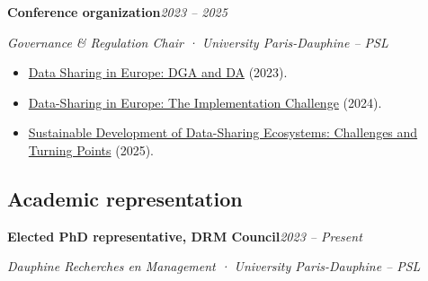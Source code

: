 \documentclass[11pt,a4paper]{article}
\newlength{\cvindent}
\newenvironment{cvblock}[1][1]{%
  \par\noindent\hspace*{#1\cvindent}%
  \begin{minipage}{\dimexpr\linewidth-#1\cvindent\relax}%
}{%
  \end{minipage}\par
}
\newenvironment{cvdetails}{%
  \begin{list}{}{%
    \setlength{\leftmargin}{\cvindent}%
    \setlength{\rightmargin}{0pt}%
    \setlength{\topsep}{0.1em}%
    \setlength{\partopsep}{0pt}%
    \setlength{\parsep}{0.05em}%
    \setlength{\itemsep}{0pt}%
  }\item[]\small\ignorespaces
}{%
  \end{list}
}
\begin{document}
\begin{cvblock}[2]
\textbf{Conference organization}\hfill\textit{2023 -- 2025}\par
\begin{cvdetails}
{\small\itshape Governance \& Regulation Chair · University Paris-Dauphine -- PSL}\par
\begin{itemize}
  \item \href{https://chairgovreg.fondation-dauphine.fr/fr/ressources/1603/replay-data-sharing-europe-dga-and-da-legal-consensus-achievement-implementation}{Data Sharing in Europe: DGA and DA} (2023).
  \item \href{https://chairgovreg.fondation-dauphine.fr/en/publication/1809/synthesis-data-sharing-europe-implementation-challenge}{Data-Sharing in Europe: The Implementation Challenge} (2024).
  \item \href{https://www.fondation-dauphine.fr/agenda/2025/08/sustainable-development-data-sharing-ecosystems-challenges-and-turning-points}{Sustainable Development of Data-Sharing Ecosystems: Challenges and Turning Points} (2025).
\end{itemize}
\end{cvdetails}
\end{cvblock}\par

\subsection*{Academic representation}
\begin{cvblock}[2]
\textbf{Elected PhD representative, DRM Council}\hfill\textit{2023 -- Present}\par
\begin{cvdetails}
{\small\itshape Dauphine Recherches en Management · University Paris-Dauphine -- PSL}
\end{cvdetails}
\end{cvblock}\par
\end{document}
